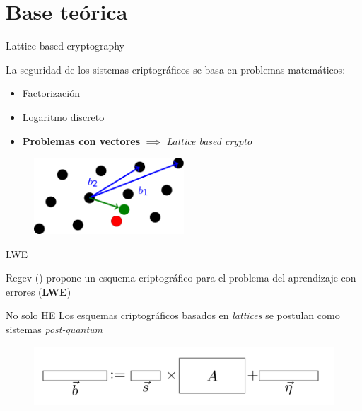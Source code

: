 \documentclass{beamer}
\begin{document}
\section{Base teórica}

\begin{frame}{Lattice based cryptography}

    La seguridad de los sistemas criptográficos se basa en problemas matemáticos:
    
    \begin{itemize}
        \item Factorización
        \item Logaritmo discreto
        \item \textbf{Problemas con vectores} $\implies$ \textit{Lattice based crypto}
    \end{itemize}

    \begin{figure}
        \centering\includegraphics[width=0.5\textwidth]{cvp}
    \end{figure}

\end{frame}

\begin{frame}{LWE}

    Regev (\cite{regev_learning_2010}) propone un esquema criptográfico para el problema del aprendizaje con errores (\textbf{LWE})
    
    \begin{alertblock}{No solo HE}
    Los esquemas criptográficos basados en \textit{lattices} se postulan como sistemas \textit{post-quantum}
    \end{alertblock}

    \begin{figure}
        \centering
        \includegraphics[width=\textwidth]{lwe}
    \end{figure}
    

\end{frame}
\end{document}
